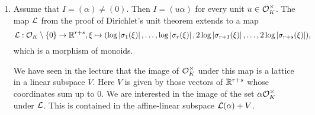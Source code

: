 \documentclass[a4paper,11pt]{article}
\begin{document}
\begin{enumerate}[wide, labelindent=0pt]
    \item Assume that $I = (\alpha) \neq (0)$.
        Then $I = (u \alpha)$ for every unit $u \in \mathcal{O}_K^\times$. 
        The map $\mathcal{L}$ from the proof of Dirichlet's unit theorem extends to a map
        \begin{equation*}
            \mathcal{L}: \mathcal{O}_K\setminus \{0\} \to \mathbb{R}^{r+s}, 
            \xi \mapsto (\log \left\lvert \sigma_1(\xi) \right\rvert, \dots, \log \left\lvert \sigma_r(\xi) \right\rvert, 
            2\log \left\lvert \sigma_{r+1}(\xi) \right\rvert, \dots, 2 \log \left\lvert \sigma_{r+s}(\xi) \right\rvert),
        \end{equation*}
        which is a morphism of monoids.

        We have seen in the lecture that the image of $\mathcal{O}_K^\times$ under this map 
        is a lattice in a linear subspace $V$. Here $V$ is given by those vectors
        of $\mathbb{R}^{r+s}$ whose coordinates sum up to $0$. We are interested
        in the image of the set $\alpha \mathcal{O}_K^\times$ under $\mathcal{L}$. This is contained
        in the affine-linear subspace $\mathcal{L}(\alpha) + V$. 
        

\end{enumerate}
\end{document}
